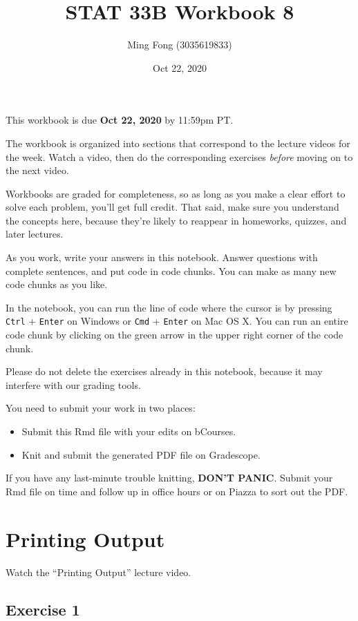 \documentclass[
]{article}
\title{STAT 33B Workbook 8}
\author{Ming Fong (3035619833)}
\date{Oct 22, 2020}
\providecommand{\tightlist}{%
  \setlength{\itemsep}{0pt}\setlength{\parskip}{0pt}}
\begin{document}
\maketitle

This workbook is due \textbf{Oct 22, 2020} by 11:59pm PT.

The workbook is organized into sections that correspond to the lecture
videos for the week. Watch a video, then do the corresponding exercises
\emph{before} moving on to the next video.

Workbooks are graded for completeness, so as long as you make a clear
effort to solve each problem, you'll get full credit. That said, make
sure you understand the concepts here, because they're likely to
reappear in homeworks, quizzes, and later lectures.

As you work, write your answers in this notebook. Answer questions with
complete sentences, and put code in code chunks. You can make as many
new code chunks as you like.

In the notebook, you can run the line of code where the cursor is by
pressing \texttt{Ctrl} + \texttt{Enter} on Windows or \texttt{Cmd} +
\texttt{Enter} on Mac OS X. You can run an entire code chunk by clicking
on the green arrow in the upper right corner of the code chunk.

Please do not delete the exercises already in this notebook, because it
may interfere with our grading tools.

You need to submit your work in two places:

\begin{itemize}
\tightlist
\item
  Submit this Rmd file with your edits on bCourses.
\item
  Knit and submit the generated PDF file on Gradescope.
\end{itemize}

If you have any last-minute trouble knitting, \textbf{DON'T PANIC}.
Submit your Rmd file on time and follow up in office hours or on Piazza
to sort out the PDF.

\hypertarget{printing-output}{%
\section{Printing Output}\label{printing-output}}

Watch the ``Printing Output'' lecture video.

\hypertarget{exercise-1}{%
\subsection{Exercise 1}\label{exercise-1}}
\end{document}
